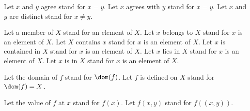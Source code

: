 


\begin{forthel}

  Let $x$ and $y$ agree stand for $x = y$.
  Let $x$ agrees with $y$ stand for $x = y$.
  Let $x$ and $y$ are distinct stand for $x \neq y$.


  Let a member of $X$ stand for an element of $X$.
  Let $x$ belongs to $X$ stand for $x$ is an element of $X$.
  Let $X$ contains $x$ stand for $x$ is an element of $X$.
  Let $x$ is contained in $X$ stand for $x$ is an element of $X$.
  Let $x$ lies in $X$ stand for $x$ is an element of $X$.
  Let $x$ is in $X$ stand for $x$ is an element of $X$.


  Let the domain of $f$ stand for $\dom(f)$.
  Let $f$ is defined on $X$ stand for $\dom(f) = X$.


  Let the value of $f$ at $x$ stand for $f(x)$.
  Let $f(x,y)$ stand for $f((x,y))$.
\end{forthel}
